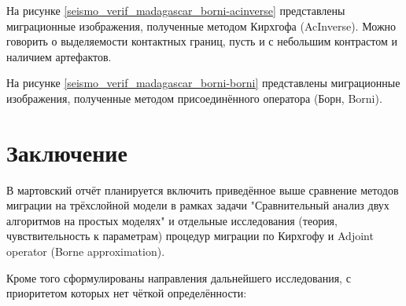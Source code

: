 \documentclass{article}
\begin{document}
На рисунке \ref{seismo_verif_madagascar_borni-acinverse} представлены миграционные изображения, полученные методом Кирхгофа (AcInverse).
Можно говорить о выделяемости контактных границ, пусть и с небольшим контрастом и наличием артефактов.

\noindent
\begin{minipage}{\linewidth}
\label{seismo_verif_madagascar_borni-acinverse}
\end{minipage}

На рисунке \ref{seismo_verif_madagascar_borni-borni} представлены миграционные изображения, полученные методом присоединённого оператора (Борн, Borni).

\noindent
\begin{minipage}{\linewidth}
\label{seismo_verif_madagascar_borni-borni}
\end{minipage}

\section{Заключение}


В мартовский отчёт планируется включить приведённое выше сравнение методов миграции на трёхслойной модели в рамках задачи "Сравнительный анализ двух алгоритмов на простых моделях" и отдельные исследования (теория, чувствительность к параметрам) процедур миграции по Кирхгофу и Adjoint operator (Borne approximation).

Кроме того сформулированы направления дальнейшего исследования, с приоритетом которых нет чёткой определённости: 
\end{document}

